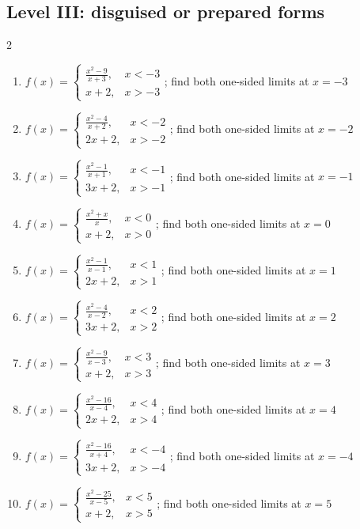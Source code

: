 \documentclass[11pt,oneside]{book}
\begin{document}
\subsection*{Level III: disguised or prepared forms}
\begin{multicols}{2}
\begin{enumerate}[leftmargin=*,label=\textbf{\arabic*.},itemsep=0.65\baselineskip]
\item $f(x)=\begin{cases} \frac{x^{2} - 9}{x + 3}, & x<-3\\ x + 2, & x>-3 \end{cases}$; find both one-sided limits at $x=-3$
\item $f(x)=\begin{cases} \frac{x^{2} - 4}{x + 2}, & x<-2\\ 2 x + 2, & x>-2 \end{cases}$; find both one-sided limits at $x=-2$
\item $f(x)=\begin{cases} \frac{x^{2} - 1}{x + 1}, & x<-1\\ 3 x + 2, & x>-1 \end{cases}$; find both one-sided limits at $x=-1$
\item $f(x)=\begin{cases} \frac{x^{2} + x}{x}, & x<0\\ x + 2, & x>0 \end{cases}$; find both one-sided limits at $x=0$
\item $f(x)=\begin{cases} \frac{x^{2} - 1}{x - 1}, & x<1\\ 2 x + 2, & x>1 \end{cases}$; find both one-sided limits at $x=1$
\item $f(x)=\begin{cases} \frac{x^{2} - 4}{x - 2}, & x<2\\ 3 x + 2, & x>2 \end{cases}$; find both one-sided limits at $x=2$
\item $f(x)=\begin{cases} \frac{x^{2} - 9}{x - 3}, & x<3\\ x + 2, & x>3 \end{cases}$; find both one-sided limits at $x=3$
\item $f(x)=\begin{cases} \frac{x^{2} - 16}{x - 4}, & x<4\\ 2 x + 2, & x>4 \end{cases}$; find both one-sided limits at $x=4$
\item $f(x)=\begin{cases} \frac{x^{2} - 16}{x + 4}, & x<-4\\ 3 x + 2, & x>-4 \end{cases}$; find both one-sided limits at $x=-4$
\item $f(x)=\begin{cases} \frac{x^{2} - 25}{x - 5}, & x<5\\ x + 2, & x>5 \end{cases}$; find both one-sided limits at $x=5$
\end{enumerate}
\end{multicols}
\end{document}
